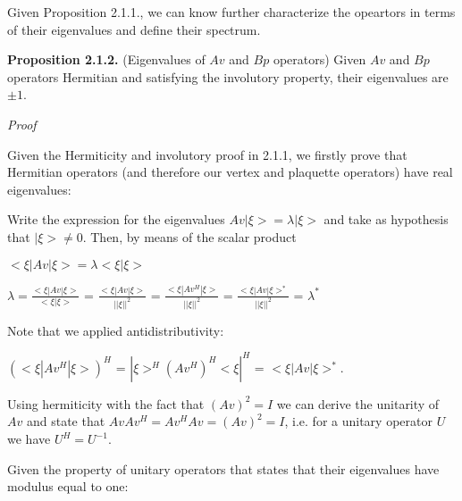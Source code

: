 \documentclass[12pt]{report}
\begin{document}
	
	\begin{minipage}{1\textwidth}
		
		
		Given Proposition 2.1.1., we can know further characterize the opeartors in terms of their eigenvalues and define their spectrum.	\newline
		
		\textbf{Proposition 2.1.2.} (Eigenvalues of $Av$ and $Bp$ operators) Given $Av$ and $Bp$ operators Hermitian and satisfying the involutory property, their eigenvalues are $\pm 1$.
		\newline
		
		\textit{Proof}\newline
		
		Given the Hermiticity and involutory proof in 2.1.1, we firstly prove that Hermitian operators (and therefore our vertex and plaquette operators) have real eigenvalues: \newline
		
		Write the expression for the eigenvalues $Av |\xi> = \lambda |\xi>$ and take as hypothesis that $|\xi> \neq 0$. Then, by means of the scalar product\newline
		
		\begin{center}
			$<\xi|Av|\xi> = \lambda <\xi |\xi>$\newline
			
			$\lambda = \frac {<\xi|Av|\xi>}{<\xi |\xi>}$ = $\frac {<\xi|Av|\xi>}{||\xi||^2}$ = $\frac {<\xi|Av^H|\xi>}{||\xi||^2}$ = $\frac {<\xi|Av|\xi>^*}{||\xi||^2}$ = $\lambda^*$\newline
		\end{center}
		
		Note that we applied antidistributivity: \newline
		
		\begin{center}
			$(<\xi|Av^H|\xi>)^H$ = $|\xi>^H (Av^H)^H <\xi|^H$ = $<\xi|Av|\xi>^*$. \newline
		\end{center}
		
		Using hermiticity with the fact that $(Av)^2=I$ we can derive the unitarity of $Av$ and state that $Av Av^H = Av^H Av = (Av)^2 = I$, i.e. for a unitary operator $U$ we have $U^H=U^{-1}$. \newline
		
		Given the property of unitary operators that states that their eigenvalues have modulus equal to one:\newline 
		

\end{minipage}
\end{document}
